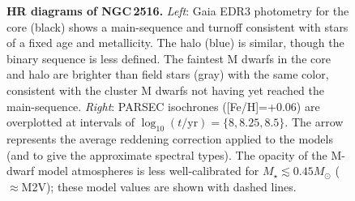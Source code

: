 \documentclass[12pt,twocolumn,tighten]{aastex63}
\begin{document}
\begin{figure}[t]
	\begin{center}
		\leavevmode
	\end{center}
	\vspace{-0.7cm}
  \caption{ {\bf HR diagrams of NGC\,2516.}
    {\it Left}: Gaia EDR3 photometry for the core (black) shows a
    main-sequence and turnoff consistent with stars of a fixed age and
    metallicity.  The halo (blue) is similar, though the binary
    sequence is less defined.  The faintest M dwarfs in the core and
    halo are brighter than field stars (gray) with the same color,
    consistent with the cluster M dwarfs not having yet reached the
    main-sequence.  {\it Right}: PARSEC isochrones ([Fe/H]=+0.06) are
    overplotted at intervals of $\log_{10}(t/\mathrm{yr})=\{8, 8.25,
    8.5\}$.  The arrow represents the average reddening correction
    applied to the models (and to give the approximate spectral
    types).  The opacity of the M-dwarf model atmospheres is less
    well-calibrated for $M_\star \lesssim 0.45M_\odot$ ($\approx$M2V);
    these model values are shown with dashed lines.
    \label{fig:hr}
  }
\end{figure}
\end{document}
